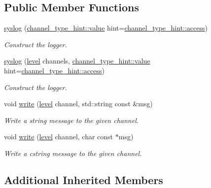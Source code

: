 \subsection*{Public Member Functions}
\begin{DoxyCompactItemize}
\item 
\hyperlink{classwebsocketpp_1_1log_1_1syslog_ab43c642587ea5628c25407341b0e5b11}{syslog} (\hyperlink{structwebsocketpp_1_1log_1_1channel__type__hint_ad12a7f6555b71aabdc4cbec604dc89dd}{channel\+\_\+type\+\_\+hint\+::value} hint=\hyperlink{structwebsocketpp_1_1log_1_1channel__type__hint_a8c38587fffbffbfcfc35577734b0d653}{channel\+\_\+type\+\_\+hint\+::access})
\begin{DoxyCompactList}\small\item\em Construct the logger. \end{DoxyCompactList}\item 
\hyperlink{classwebsocketpp_1_1log_1_1syslog_a28c4016aa44ca9d6415c36c2bc85bf30}{syslog} (\hyperlink{namespacewebsocketpp_1_1log_a12d4d17939f102db8c9183d400a41960}{level} channels, \hyperlink{structwebsocketpp_1_1log_1_1channel__type__hint_ad12a7f6555b71aabdc4cbec604dc89dd}{channel\+\_\+type\+\_\+hint\+::value} hint=\hyperlink{structwebsocketpp_1_1log_1_1channel__type__hint_a8c38587fffbffbfcfc35577734b0d653}{channel\+\_\+type\+\_\+hint\+::access})
\begin{DoxyCompactList}\small\item\em Construct the logger. \end{DoxyCompactList}\item 
void \hyperlink{classwebsocketpp_1_1log_1_1syslog_a48c3f60a621c9ffd9cebbe0959a29ca6}{write} (\hyperlink{namespacewebsocketpp_1_1log_a12d4d17939f102db8c9183d400a41960}{level} channel, std\+::string const \&msg)
\begin{DoxyCompactList}\small\item\em Write a string message to the given channel. \end{DoxyCompactList}\item 
void \hyperlink{classwebsocketpp_1_1log_1_1syslog_a2fda2d9b4aa71d4b47b7e93359b5b0d9}{write} (\hyperlink{namespacewebsocketpp_1_1log_a12d4d17939f102db8c9183d400a41960}{level} channel, char const $\ast$msg)
\begin{DoxyCompactList}\small\item\em Write a cstring message to the given channel. \end{DoxyCompactList}\end{DoxyCompactItemize}
\subsection*{Additional Inherited Members}


